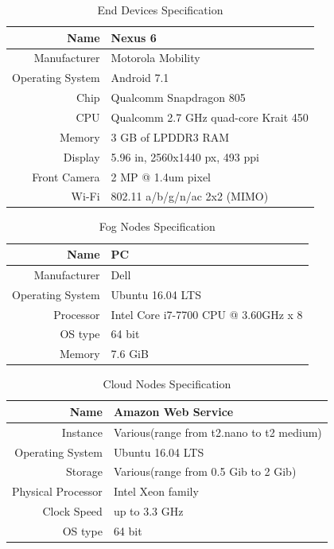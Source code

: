 \begin{table}[h!]
\centering
\begin{tabular}{ |r|l| }
 \hline
Name &	Nexus 6\\
 \hline
Manufacturer &	Motorola Mobility\\
 \hline
Operating System &	Android 7.1\\
 \hline
Chip & Qualcomm Snapdragon 805\\
 \hline
CPU &	Qualcomm 2.7 GHz quad-core Krait 450\\
 \hline
Memory & 3 GB of LPDDR3 RAM \\
 \hline
Display & 5.96 in, 2560x1440 px, 493 ppi \\
 \hline
Front Camera & 2 MP @ 1.4um pixel \\
 \hline
Wi-Fi & 802.11 a/b/g/n/ac 2x2 (MIMO) \\
 \hline
\end{tabular}
\caption{End Devices Specification}
\label{table:end_devices_spec}
\end{table}

\begin{table}[h!]
\centering
\begin{tabular}{ |r|l| }
 \hline
Name &	PC \\
 \hline
Manufacturer &	Dell\\
 \hline
Operating System &	Ubuntu 16.04 LTS\\
 \hline
Processor & Intel Core i7-7700 CPU @ 3.60GHz x 8\\
 \hline
OS type & 64 bit\\
 \hline
Memory & 7.6 GiB\\
 \hline
\end{tabular}
\caption{Fog Nodes Specification}
\label{table:fog_nodes_spec}
\end{table}

\begin{table}[h!]
\centering
\begin{tabular}{ |r|l| }
 \hline
Name &	Amazon Web Service \\
 \hline
Instance & Various(range from t2.nano to t2 medium) \\
 \hline
Operating System &	Ubuntu 16.04 LTS\\
 \hline
Storage & Various(range from 0.5 Gib to 2 Gib)\\
 \hline
Physical Processor & Intel Xeon family\\
 \hline
Clock Speed & up to 3.3 GHz\\
 \hline
OS type & 64 bit\\
 \hline
\end{tabular}
\caption{Cloud Nodes Specification}
\label{table:cloud_nodes_spec}
\end{table}